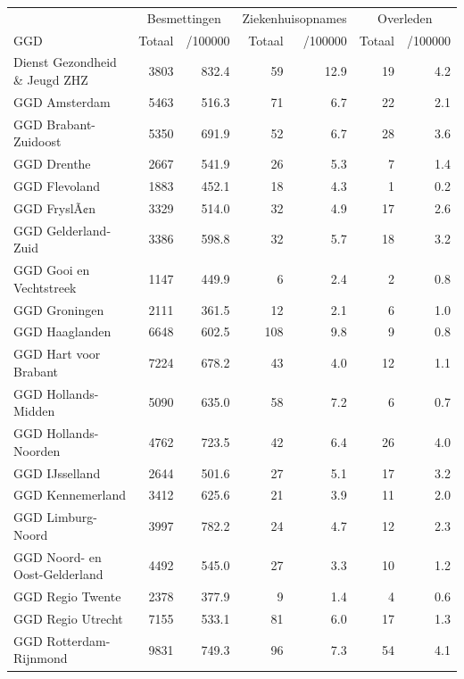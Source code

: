 \documentclass[
  english,
  man,floatsintext]{apa6}
\begin{document}
\begin{table}
\centering\begingroup\fontsize{10}{12}\selectfont

\begin{threeparttable}
\begin{tabular}{lrrrrrr}
\toprule
\multicolumn{1}{c}{ } & \multicolumn{2}{c}{Besmettingen} & \multicolumn{2}{c}{Ziekenhuisopnames} & \multicolumn{2}{c}{Overleden} \\
\cmidrule(l{3pt}r{3pt}){2-3} \cmidrule(l{3pt}r{3pt}){4-5} \cmidrule(l{3pt}r{3pt}){6-7}
GGD & Totaal & /100000 & Totaal & /100000 & Totaal & /100000\\
\midrule
Dienst Gezondheid \& Jeugd ZHZ & 3803 & 832.4 & 59 & 12.9 & 19 & 4.2\\
GGD Amsterdam & 5463 & 516.3 & 71 & 6.7 & 22 & 2.1\\
GGD Brabant-Zuidoost & 5350 & 691.9 & 52 & 6.7 & 28 & 3.6\\
GGD Drenthe & 2667 & 541.9 & 26 & 5.3 & 7 & 1.4\\
GGD Flevoland & 1883 & 452.1 & 18 & 4.3 & 1 & 0.2\\
GGD FryslÃ¢n & 3329 & 514.0 & 32 & 4.9 & 17 & 2.6\\
GGD Gelderland-Zuid & 3386 & 598.8 & 32 & 5.7 & 18 & 3.2\\
GGD Gooi en Vechtstreek & 1147 & 449.9 & 6 & 2.4 & 2 & 0.8\\
GGD Groningen & 2111 & 361.5 & 12 & 2.1 & 6 & 1.0\\
GGD Haaglanden & 6648 & 602.5 & 108 & 9.8 & 9 & 0.8\\
GGD Hart voor Brabant & 7224 & 678.2 & 43 & 4.0 & 12 & 1.1\\
GGD Hollands-Midden & 5090 & 635.0 & 58 & 7.2 & 6 & 0.7\\
GGD Hollands-Noorden & 4762 & 723.5 & 42 & 6.4 & 26 & 4.0\\
GGD IJsselland & 2644 & 501.6 & 27 & 5.1 & 17 & 3.2\\
GGD Kennemerland & 3412 & 625.6 & 21 & 3.9 & 11 & 2.0\\
GGD Limburg-Noord & 3997 & 782.2 & 24 & 4.7 & 12 & 2.3\\
GGD Noord- en Oost-Gelderland & 4492 & 545.0 & 27 & 3.3 & 10 & 1.2\\
GGD Regio Twente & 2378 & 377.9 & 9 & 1.4 & 4 & 0.6\\
GGD Regio Utrecht & 7155 & 533.1 & 81 & 6.0 & 17 & 1.3\\
GGD Rotterdam-Rijnmond & 9831 & 749.3 & 96 & 7.3 & 54 & 4.1\\

\end{tabular}
\end{threeparttable}
\end{table}
\end{document}
